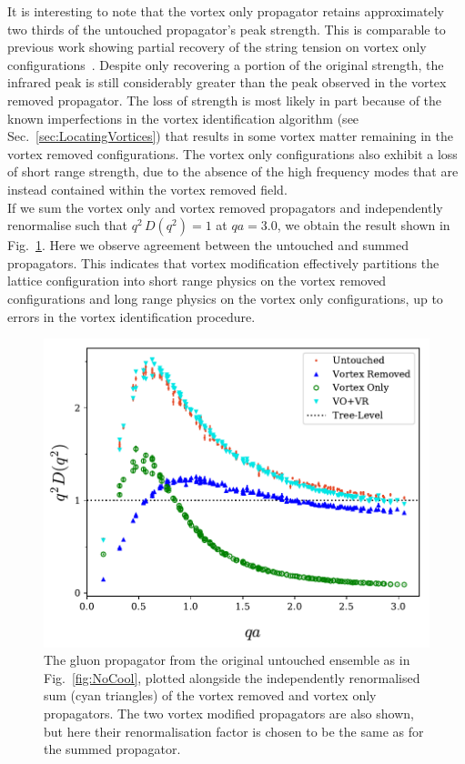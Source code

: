 It is interesting to note that the vortex only propagator retains approximately two thirds of the untouched propagator's peak strength. This is comparable to previous work showing partial recovery of the string tension on vortex only configurations~\cite{Trewartha:2015ida,Trewartha:2017ive,Langfeld:2003ev,Stack:2002sy}. Despite only recovering a portion of the original strength, the infrared peak is still considerably greater than the peak observed in the vortex removed propagator. The loss of strength is most likely in part because of the known imperfections in the vortex identification algorithm (see Sec.~\ref{sec:LocatingVortices}) that results in some vortex matter remaining in the vortex removed configurations. The vortex only configurations also exhibit a loss of short range strength, due to the absence of the high frequency modes that are instead contained within the vortex removed field.\\

If we sum the vortex only and vortex removed propagators and independently renormalise such that $q^2\,D(q^2)=1$ at $qa=3.0$, we obtain the result shown in Fig.~\ref{fig:NoCoolSum}. Here we observe agreement between the untouched and summed propagators. This indicates that vortex modification effectively partitions the lattice configuration into short range physics on the vortex removed configurations and long range physics on the vortex only configurations, up to errors in the vortex identification procedure.\\
%
\begin{figure}[tb]
\centering
\includegraphics[width=\linewidth]{./ScalarGluComp_q2_NoCoolSum2.pdf}
\caption[The gluon propagator from the original untouched alongside the independently renormalised sum of the vortex removed and vortex only propagators.]{\label{fig:NoCoolSum}The gluon propagator from the original untouched ensemble as in Fig.~\ref{fig:NoCool}, plotted alongside the independently renormalised sum (cyan triangles) of the vortex removed and vortex only propagators. The two vortex modified propagators are also shown, but here their renormalisation factor is chosen to be the same as for the summed propagator.}
\end{figure}
%


